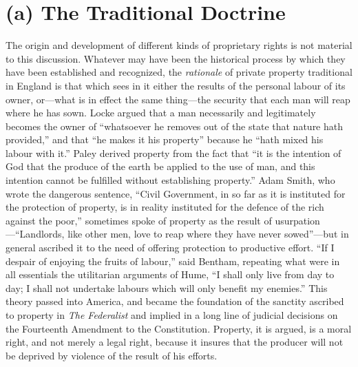 \documentclass{book}
\begin{document}
\section{(a) The Traditional Doctrine}
The origin and development of different kinds of proprietary rights is not material to this discussion. Whatever may have been the historical process by which they have been established and recognized, the \emph{rationale} of private property traditional in England is that which sees in it either the results of the personal labour of its owner, or—what is in effect the same thing—the security that each man will reap where he has sown. Locke argued that a man necessarily and legitimately becomes the owner of “whatsoever he removes out of the state that nature hath provided,” and that “he makes it his property” because he “hath mixed his labour with it.” Paley derived property from the fact that “it is the intention of God that the produce of the earth be applied to the use of man, and this intention cannot be fulfilled without establishing property.” Adam Smith, who wrote the dangerous sentence, “Civil Government, in so far as it is instituted for the protection of property, is in reality instituted for the defence of the rich against the poor,” sometimes spoke of property as the result of usurpation—“Landlords, like other men, love to reap where they have never sowed”—but in general ascribed it to the need of offering protection to productive effort. “If I despair of enjoying the fruits of labour,” said Bentham, repeating what were in all essentials the utilitarian arguments of Hume, “I shall only live from day to day; I shall not undertake labours which will only benefit my enemies.” This theory passed into America, and became the foundation of the sanctity ascribed to property in \emph{The Federalist} and implied in a long line of judicial decisions on the Fourteenth Amendment to the Constitution. Property, it is argued, is a moral right, and not merely a legal right, because it insures that the producer will not be deprived by violence of the result of his efforts.
\end{document}
